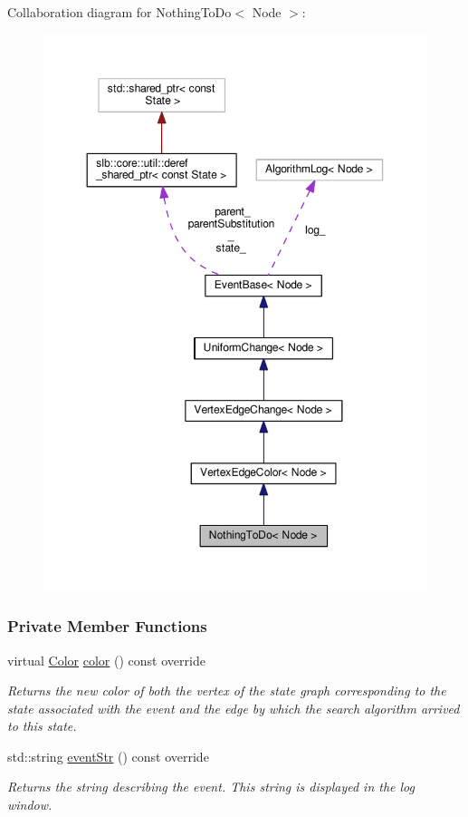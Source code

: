 Collaboration diagram for Nothing\+To\+Do$<$ Node $>$\+:\nopagebreak
\begin{figure}[H]
\begin{center}
\leavevmode
\includegraphics[width=350pt]{structNothingToDo__coll__graph}
\end{center}
\end{figure}
\subsubsection*{Private Member Functions}
\begin{DoxyCompactItemize}
\item 
virtual \hyperlink{colors_8h_ab87bacfdad76e61b9412d7124be44c1c}{Color} \hyperlink{structNothingToDo_aedd48ed286603dac6b05f251532eeb62}{color} () const override
\begin{DoxyCompactList}\small\item\em Returns the new color of both the vertex of the state graph corresponding to the state associated with the event and the edge by which the search algorithm arrived to this state. \end{DoxyCompactList}\item 
std\+::string \hyperlink{structNothingToDo_a009eeb6275872bc48ba04dc8e772bc6c}{event\+Str} () const override
\begin{DoxyCompactList}\small\item\em Returns the string describing the event. This string is displayed in the log window. \end{DoxyCompactList}\end{DoxyCompactItemize}
